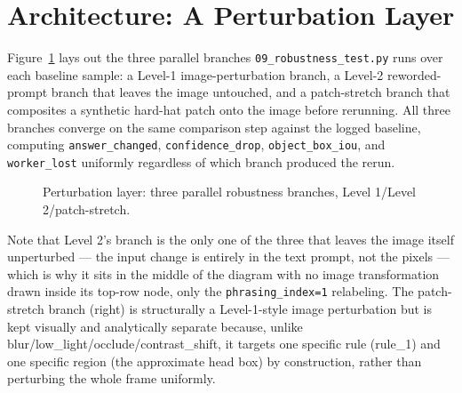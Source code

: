 \section{Architecture: A Perturbation Layer}

Figure~\ref{fig:diagram-e} lays out the three parallel branches \texttt{09\_robustness\_test.py}
runs over each baseline sample: a Level-1 image-perturbation branch, a Level-2 reworded-prompt
branch that leaves the image untouched, and a patch-stretch branch that composites a synthetic
hard-hat patch onto the image before rerunning. All three branches converge on the same comparison
step against the logged baseline, computing \texttt{answer\_changed}, \texttt{confidence\_drop},
\texttt{object\_box\_iou}, and \texttt{worker\_lost} uniformly regardless of which branch produced
the rerun.

\begin{figure}[h]
\centering
{}
\caption{Perturbation layer: three parallel robustness branches, Level 1/Level 2/patch-stretch.}
\label{fig:diagram-e}
\end{figure}

Note that Level 2's branch is the only one of the three that leaves the image itself unperturbed ---
the input change is entirely in the text prompt, not the pixels --- which is why it sits in the
middle of the diagram with no image transformation drawn inside its top-row node, only the
\texttt{phrasing\_index=1} relabeling. The patch-stretch branch (right) is structurally a
Level-1-style image perturbation but is kept visually and analytically separate because, unlike
blur/low\_light/occlude/contrast\_shift, it targets one specific rule (rule\_1) and one specific
region (the approximate head box) by construction, rather than perturbing the whole frame uniformly.

